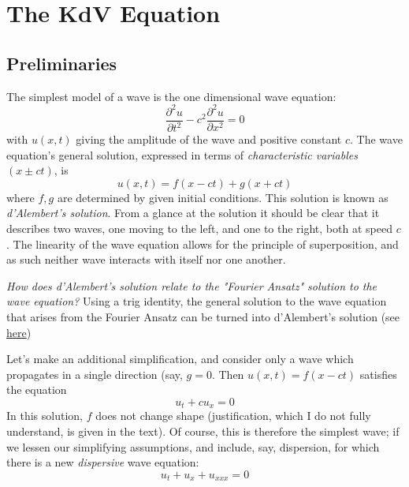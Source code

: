\documentclass[12pt]{article}
\begin{document}
\section{The KdV Equation}

\subsection{Preliminaries}
The simplest model of a wave is the one dimensional wave equation:
\begin{equation}
\frac{\partial^2 u}{\partial t^2} - c^2 \frac{\partial^2 u}{\partial x^2} = 0
\end{equation}
with $u(x, t)$ giving the amplitude of the wave and positive constant $c$.
The wave equation's general solution, expressed in terms of \textit{characteristic variables} $(x \pm ct)$, is
\begin{equation}
	u(x, t) = f(x - ct) + g(x + ct)
\end{equation}
where $f, g$ are determined by given initial conditions. This solution is known as \textit{d'Alembert's solution}. From a glance at the solution it should be clear that it describes two waves, one moving to the left, and one to the right, both at speed $c$. The linearity of the wave equation allows for the principle of superposition, and as such neither wave interacts with itself nor one another. 
\begin{aside} {\textit{How does d'Alembert's solution relate to the "Fourier Ansatz" solution to the wave equation?}} {}
\medbreak Using a trig identity, the general solution to the wave equation that arises from the Fourier Ansatz can be turned into d'Alembert's solution (see \href{https://math.libretexts.org/Bookshelves/Differential_Equations/Differential_Equations_(Chasnov)/09%3A_Partial_Differential_Equations/9.06%3A_Solution_of_the_Wave_Equation}{here})
\end{aside}

Let's make an additional simplification, and consider only a wave which propagates in a single direction (say, $g = 0$. Then $u(x, t) = f(x - ct)$ satisfies the equation
\begin{equation}
	u_{t} + cu_{x} = 0
\end{equation}
In this solution, $f$ does not change shape (justification, which I do not fully understand, is given in the text). Of course, this is therefore the simplest wave; if we lessen our simplifying assumptions, and include, say, dispersion, for which there is a new \textit{dispersive} wave equation:
\begin{equation}
	u_t + u_x + u_{xxx} = 0
\end{equation}
\end{document}
